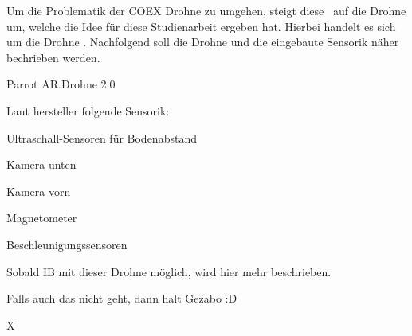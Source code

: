 
Um die Problematik der COEX Drohne zu umgehen, steigt diese \Arbeit\ auf die Drohne um, welche die Idee für diese Studienarbeit ergeben hat.
Hierbei handelt es sich um die Drohne \Ar. Nachfolgend soll die Drohne und die eingebaute Sensorik näher bechrieben werden.






Parrot AR.Drohne 2.0

Laut hersteller folgende Sensorik:

Ultraschall-Sensoren für Bodenabstand

Kamera unten

Kamera vorn


Magnetometer

Beschleunigungssensoren







Sobald IB mit dieser Drohne möglich, wird hier mehr beschrieben.

Falls auch das nicht geht, dann halt Gezabo :D









X






































